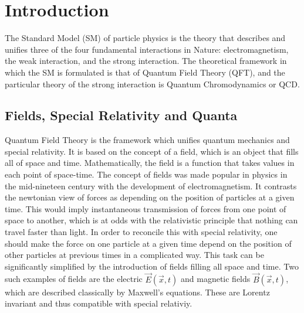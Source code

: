 \chapter*{Introduction}


\label{ch_introduction}


The Standard Model (SM) of particle physics is the theory that describes and unifies three of the four fundamental interactions in Nature: electromagnetism, the weak interaction, and the strong interaction. The theoretical framework in which the SM is formulated is that of Quantum Field Theory (QFT), and the particular theory of the strong interaction is Quantum Chromodynamics or QCD.

\section{Fields, Special Relativity and Quanta}

Quantum Field Theory is the framework which unifies quantum mechanics and special relativity. It is based on the concept of a field, which is an object that fills all of space and time. Mathematically, the field is a function that takes values in each point of space-time. The concept of fields was made popular in physics in the mid-nineteen century with the development of electromagnetism. It contrasts the newtonian view of forces as depending on the position of particles at a given time. This would imply instantaneous transmission of forces from one point of space to another, which is at odds with the relativistic principle that nothing can travel faster than light. In order to reconcile this with special relativity, one should make the force on one particle at a given time depend on the position of other particles at previous times in a complicated way. This task can be significantly simplified by the introduction of fields filling all space and time. Two such examples of fields are the electric $\vec{E}(\vec{x},t)$ and magnetic fields $\vec{B}(\vec{x},t)$, which are described classically by Maxwell's equations. These are Lorentz invariant and thus compatible with special relativiy.

